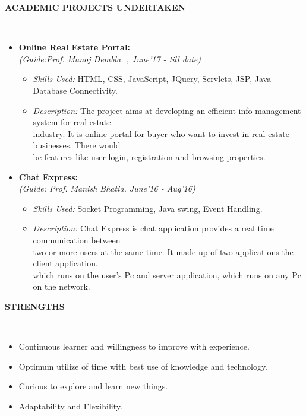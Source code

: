\documentclass[a4paper,10pt]{article}
\newcommand{\isep}{-2 pt}
\newcommand{\lsep}{-0.5cm}
\newcommand{\resheading}[1]{{\small \colorbox{mygrey}{\begin{minipage}{0.975\textwidth}{\textbf{#1 \vphantom{p\^{E}}}}\end{minipage}}}}
\begin{document}
\resheading{\textbf{ACADEMIC PROJECTS UNDERTAKEN } }\\[\lsep]
\begin{itemize}
\item \textbf{Online Real Estate Portal: } \\
 \emph{(Guide:Prof. Manoj Dembla.
, June'17 - till date)} \\[-0.6cm]
	\begin{itemize}\itemsep \isep
	\item \textit{Skills Used:} HTML, CSS, JavaScript, JQuery, Servlets, JSP, Java Database Connectivity.
	\item \textit{Description:} The project aims at developing an efficient info management system for real estate \\
	industry. It is online portal for buyer who want to invest in real estate businesses. There would
	\\ 
	be features like user login, registration and browsing properties.

	\end{itemize}

\item \textbf{Chat Express:}\\
 \emph{(Guide: Prof. Manish Bhatia, June'16 - Aug'16)} \\[-0.6cm]
	\begin{itemize}\itemsep \isep
	\item \textit{Skills Used:} Socket Programming, Java swing, Event Handling.
	\item \textit{Description:} Chat Express is chat application provides a real time communication between\\
	two or more users at the same time. It made up of two applications the client application,\\ 
	which runs on the user’s Pc and server application, which runs on any Pc on the network. 
	\end{itemize}
\end{itemize}

\resheading{\textbf{STRENGTHS} }\\[\lsep]
\begin{itemize}
\item \noindent	Continuous learner and willingness to improve with experience.
\item \noindent	Optimum utilize of time with best use of knowledge and technology.
\item \noindent	Curious to explore and learn new things.
\item \noindent Adaptability and Flexibility.
\end{itemize}
\end{document}
